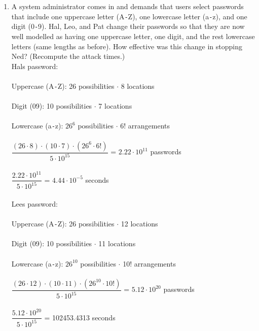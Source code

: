 \documentclass[paper=letter, fontsize=12pt]{article}
\newcommand\tab[1][1cm]{\hspace*{#1}}
\begin{document}
\begin{enumerate}[label=(\alph*)]
    \item A system administrator comes in and demands that users select passwords that include one
    uppercase letter (A\texttt{-}Z), one lowercase letter (a\texttt{-}z), and one digit (0\texttt{-}9). Hal, Leo, and Pat change
    their passwords so that they are now well modelled as having one uppercase letter, one digit, and
    the rest lowercase letters (same lengths as before). How effective was this change in stopping Ned?
    (Recompute the attack times.) \\

    Hal\textquotesingle s password: \\ \\
    \tab Uppercase (A\texttt{-}Z): 26 possibilities \(\cdot\) 8 locations \\ \\
    \tab Digit (0\textt{-}9): 10 possibilities \(\cdot\) 7 locations \\ \\
    \tab Lowercase (a\texttt{-}z): \(26^{6}\) possibilities \(\cdot\) 6! arrangements \\ \\
    \tab \(\dfrac{(26\cdot 8) \cdot (10\cdot 7) \cdot (26^{6}\cdot 6!)}{5\cdot 10^{15}}\) = \(2.22\cdot 10^{11}\) passwords \\ \\
    \tab \(\dfrac{2.22\cdot 10^{11}}{5\cdot 10^{15}}\) = \(4.44\cdot 10^{-5}\) seconds \\ \\

    Lee\textquotesingle s password: \\ \\
    \tab Uppercase (A\texttt{-}Z): 26 possibilities \(\cdot\) 12 locations \\ \\
    \tab Digit (0\textt{-}9): 10 possibilities \(\cdot\) 11 locations \\ \\
    \tab Lowercase (a\texttt{-}z): \(26^{10}\) possibilities \(\cdot\) 10! arrangements \\ \\
    \tab \(\dfrac{(26\cdot 12) \cdot (10\cdot 11) \cdot (26^{10}\cdot 10!)}{5\cdot 10^{15}}\) = \(5.12\cdot 10^{20}\) passwords \\ \\
    \tab \(\dfrac{5.12\cdot 10^{20}}{5\cdot 10^{15}}\) = 102453.4313 seconds \\ \\


\end{enumerate}
\end{document}
